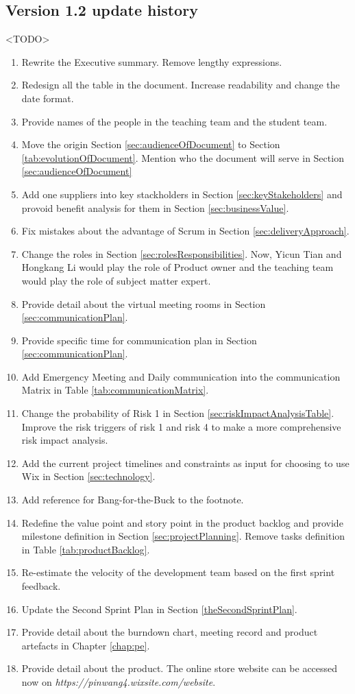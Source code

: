 \documentclass{report}
\begin{document}
\subsection{Version 1.2 update history}
\label{sec:v1-2Up}
<TODO>
  \begin{enumerate}
    \item Rewrite the Executive summary. Remove lengthy expressions.
    \item Redesign all the table in the document. Increase readability and change the date format.
    \item Provide names of the people in the teaching team and the student team.
    \item Move the origin Section \ref{sec:audienceOfDocument} to Section \ref{tab:evolutionOfDocument}. Mention who the document will serve in Section \ref{sec:audienceOfDocument}
    \item Add one suppliers into key stackholders in Section \ref{sec:keyStakeholders} and provoid benefit analysis for them in Section \ref{sec:businessValue}.
    \item Fix mistakes about the advantage of Scrum in Section \ref{sec:deliveryApproach}.
    \item Change the roles in Section \ref{sec:rolesResponsibilities}. Now, Yicun Tian and Hongkang Li would play the role of Product owner and the teaching team would play the role of subject matter expert.
    \item Provide detail about the virtual meeting rooms in Section \ref{sec:communicationPlan}.
    \item Provide specific time for communication plan in Section \ref{sec:communicationPlan}.
    \item Add Emergency Meeting and Daily communication into the communication Matrix in Table \ref{tab:communicationMatrix}.
    \item Change the probability of Risk 1 in Section \ref{sec:riskImpactAnalysisTable}. Improve the risk triggers of risk 1 and risk 4 to make a more comprehensive risk impact analysis.
	  \item Add the current project timelines and constraints as input for choosing to use Wix in Section \ref{sec:technology}.
    \item Add reference for Bang-for-the-Buck to the footnote.
    \item Redefine the value point and story point in the product backlog and provide milestone definition in Section \ref{sec:projectPlanning}. Remove tasks definition in Table \ref{tab:productBacklog}.  
    \item Re-estimate the velocity of the development team based on the first sprint feedback.
    \item Update the Second Sprint Plan in Section \ref{theSecondSprintPlan}.
    \item Provide detail about the burndown chart, meeting record and product artefacts in Chapter{} \ref{chap:pe}.
    \item Provide detail about the product. The online store website can be accessed now on \textit{https://pinwang4.wixsite.com/website}.
  \end{enumerate}
\end{document}
